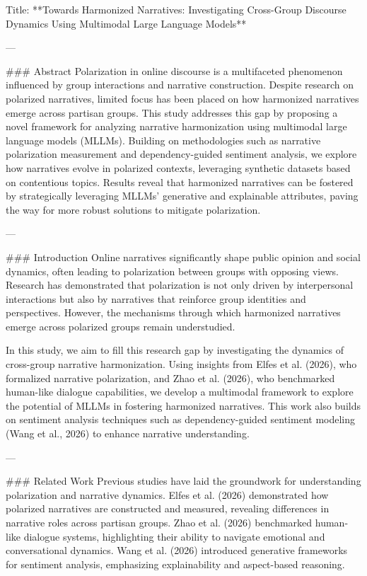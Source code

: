 Title: **Towards Harmonized Narratives: Investigating Cross-Group Discourse Dynamics Using Multimodal Large Language Models**

---

### Abstract
Polarization in online discourse is a multifaceted phenomenon influenced by group interactions and narrative construction. Despite research on polarized narratives, limited focus has been placed on how harmonized narratives emerge across partisan groups. This study addresses this gap by proposing a novel framework for analyzing narrative harmonization using multimodal large language models (MLLMs). Building on methodologies such as narrative polarization measurement and dependency-guided sentiment analysis, we explore how narratives evolve in polarized contexts, leveraging synthetic datasets based on contentious topics. Results reveal that harmonized narratives can be fostered by strategically leveraging MLLMs' generative and explainable attributes, paving the way for more robust solutions to mitigate polarization. 

---

### Introduction
Online narratives significantly shape public opinion and social dynamics, often leading to polarization between groups with opposing views. Research has demonstrated that polarization is not only driven by interpersonal interactions but also by narratives that reinforce group identities and perspectives. However, the mechanisms through which harmonized narratives emerge across polarized groups remain understudied. 

In this study, we aim to fill this research gap by investigating the dynamics of cross-group narrative harmonization. Using insights from Elfes et al. (2026), who formalized narrative polarization, and Zhao et al. (2026), who benchmarked human-like dialogue capabilities, we develop a multimodal framework to explore the potential of MLLMs in fostering harmonized narratives. This work also builds on sentiment analysis techniques such as dependency-guided sentiment modeling (Wang et al., 2026) to enhance narrative understanding.

---

### Related Work
Previous studies have laid the groundwork for understanding polarization and narrative dynamics. Elfes et al. (2026) demonstrated how polarized narratives are constructed and measured, revealing differences in narrative roles across partisan groups. Zhao et al. (2026) benchmarked human-like dialogue systems, highlighting their ability to navigate emotional and conversational dynamics. Wang et al. (2026) introduced generative frameworks for sentiment analysis, emphasizing explainability and aspect-based reasoning.

